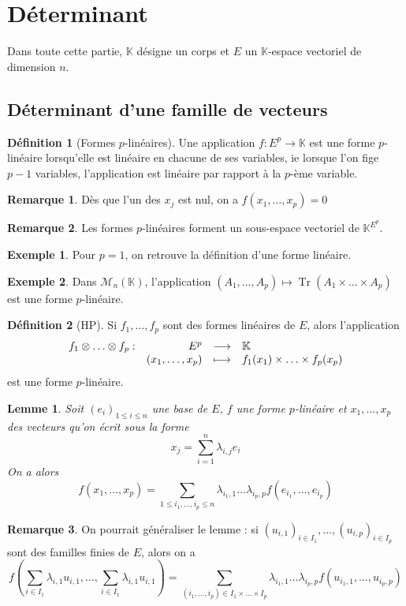 \documentclass[french]{book}
\newcommand{\K}{\mathbb{K}}
\theoremstyle{plain}
\newtheorem{lem}{Lemme}[chapter]
\theoremstyle{definition}
\newtheorem{dfn}{Définition}[chapter]
\newtheorem{exa}{Exemple}[chapter]
\newtheorem{rmq}{Remarque}[chapter]
\theoremstyle{remark}
\DeclareMathOperator{\tr}{Tr}
\begin{document}
\section{Déterminant}
Dans toute cette partie, $\K$ désigne un corps et $E$ un $\K$-espace vectoriel de dimension $n$.
\subsection{Déterminant d'une famille de vecteurs}
\begin{dfn}[Formes $p$-linéaires]
	Une application $f:E^p\rightarrow\K$ est une forme $p$-linéaire lorsqu'elle est linéaire en chacune de ses variables, ie lorsque l'on fige $p-1$ variables, l'application est linéaire par rapport à la $p$-ème variable.
\end{dfn}
\begin{rmq} Dès que l'un des $x_j$ est nul, on a $f(x_1,\ldots,x_p)=0$ \end{rmq}
 \begin{rmq} Les formes $p$-linéaires forment un sous-espace vectoriel de $\displaystyle \K^{E^p}$. \end{rmq}
\begin{exa}
	Pour $p=1$, on retrouve la définition d'une forme linéaire.
\end{exa}
\begin{exa}
	Dans $\mathcal{M}_n(\K)$, l'application $(A_1,\ldots,A_p)\mapsto\tr(A_1\times\ldots\times A_p)$ est une forme $p$-linéaire.
\end{exa}
\begin{dfn}[HP]
	Si $f_1,\ldots,f_p$ sont des formes linéaires de $E$, alors l'application
	$$
	\begin{array}[t]{lrcl}
		f_1\otimes\ldots\otimes f_p: & E^p & \longrightarrow & \K \\
		& (x_1,\ldots,x_p) & \longmapsto & f_1(x_1)\times\ldots\times f_p(x_p)
	\end{array}
	$$ est une forme $p$-linéaire.
\end{dfn}
\begin{lem}
	Soit $(e_i)_{1\leqslant i\leqslant n}$ une base de $E$, $f$ une forme $p$-linéaire et $x_1,\ldots,x_p$ des vecteurs qu'on écrit sous la forme $$x_j=\sum_{i=1}^{n}\lambda_{i,j}e_i$$ On a alors $$f(x_1,\ldots,x_p)=\sum_{1\leqslant i_1,\ldots,i_p\leqslant n}\lambda_{i_1,1}\ldots\lambda_{i_p,p}f(e_{i_1},\ldots,e_{i_p})$$
\end{lem}
\begin{rmq} On pourrait généraliser le lemme : si $(u_{i,1})_{i\in I_1},\ldots,(u_{i,p})_{i\in I_p}$ sont des familles finies de $E$, alors on a $$f\left(\sum_{i\in I_1}\lambda_{i,1}u_{i,1},\ldots,\sum_{i\in I_1}\lambda_{i,1}u_{i,1}\right)=\sum_{(i_1,\ldots,i_p)\in I_1\times\ldots\times I_p}\lambda_{i_1,1}\ldots\lambda_{i_p,p}f(u_{i_1,1},\ldots,u_{i_p,p})$$ \end{rmq}
\end{document}
